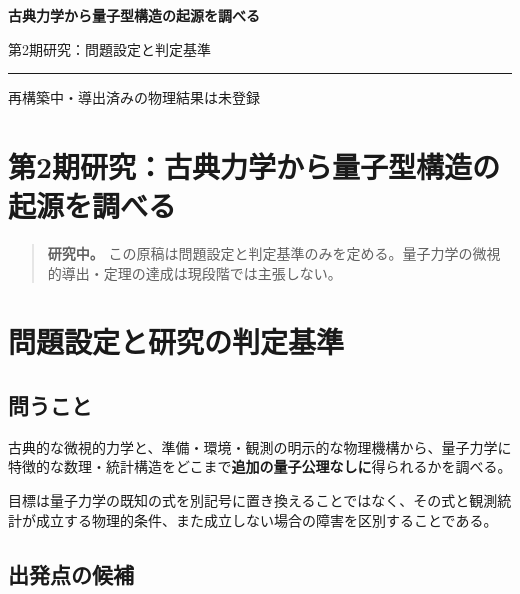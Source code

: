 \documentclass[11pt,a4paper,openany]{report}
\numberwithin{equation}{chapter}
\theoremstyle{definition}
\theoremstyle{remark}
\begin{document}
\begin{titlepage}
  \centering
  \vspace*{42mm}
  {\sffamily\bfseries\color{PaperNavy}\fontsize{22}{31}\selectfont
    古典力学から量子型構造の起源を調べる\par}
  \vspace{11mm}
  {\Large\color{PaperBlue}第2期研究：問題設定と判定基準\par}
  \vspace{12mm}
  {\color{PaperRule}\rule{0.68\textwidth}{0.9pt}\par}
  \vfill
  {\large 再構築中・導出済みの物理結果は未登録\par}
  \vspace{20mm}
\end{titlepage}

\tableofcontents
\clearpage
{}

\setcounter{chapter}{-1}
\chapter{第2期研究：古典力学から量子型構造の起源を調べる}\label{ux7b2c2ux671fux7814ux7a76ux53e4ux5178ux529bux5b66ux304bux3089ux91cfux5b50ux578bux69cbux9020ux306eux8d77ux6e90ux3092ux8abfux3079ux308b}

\begin{quote}
\textbf{研究中。} この原稿は問題設定と判定基準のみを定める。量子力学の微視的導出・定理の達成は現段階では主張しない。
\end{quote}

\chapter{問題設定と研究の判定基準}\label{ux554fux984cux8a2dux5b9aux3068ux7814ux7a76ux306eux5224ux5b9aux57faux6e96}

\section{問うこと}\label{ux554fux3046ux3053ux3068}

古典的な微視的力学と、準備・環境・観測の明示的な物理機構から、量子力学に特徴的な数理・統計構造をどこまで\textbf{追加の量子公理なしに}得られるかを調べる。

目標は量子力学の既知の式を別記号に置き換えることではなく、その式と観測統計が成立する物理的条件、また成立しない場合の障害を区別することである。

\section{出発点の候補}\label{ux51faux767aux70b9ux306eux5019ux88dc}
\end{document}
